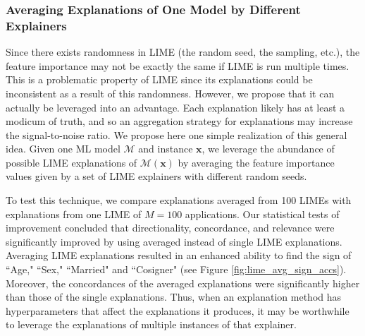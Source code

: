 \documentclass[12pt]{article}  %
\begin{document}
            \subsubsection{Averaging Explanations of One Model by Different Explainers}
            \label{sec:averaging_one_explainer}
            Since there exists randomness in LIME (the random seed, the sampling, etc.), the feature importance may not be exactly the same if LIME is run multiple times. This is a problematic property of LIME since its explanations could be inconsistent \citep{alvarez18robustness} as a result of this randomness. 
        However, we propose that it can actually be leveraged into an advantage. Each explanation likely has at least a modicum of truth, and so an aggregation strategy for explanations may increase the signal-to-noise ratio. We propose here one simple realization of this general idea. Given one ML model $\mathcal{M}$ and instance $\mathbf{x}$, we leverage the abundance of possible LIME explanations of $\mathcal{M}(\mathbf{x})$ by averaging the feature importance values given by a set of LIME explainers with different random seeds.
        
            To test this technique, we compare explanations averaged from 100 LIMEs with explanations from one LIME of $M=100$ applications. %
            Our statistical tests of improvement concluded that directionality, concordance, and relevance were significantly improved by using averaged instead of single LIME explanations. Averaging LIME explanations resulted in an enhanced ability to find the sign of ``Age," ``Sex," ``Married" and ``Cosigner" (see Figure \ref{fig:lime_avg_sign_accs}). %
            Moreover, the concordances of the averaged explanations were significantly higher than those of the single explanations. Thus, when an explanation method has hyperparameters that affect the explanations it produces, it may be worthwhile to leverage the explanations of multiple instances of that explainer.%
\end{document}
